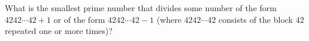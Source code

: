 What is the smallest prime number that divides some number of the form $4242\cdots42+1$ or of the form $4242\cdots42-1$ (where $4242\cdots42$ consists of the block $42$ repeated one or more times)?
